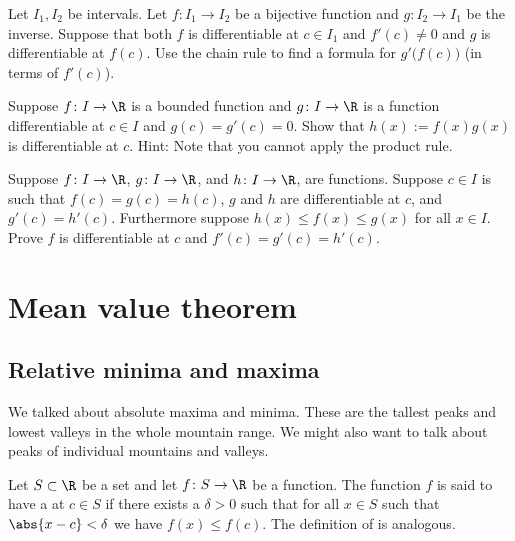 \documentclass[12pt]{book}
\begin{document}
\begin{exercise}
Let $I_1, I_2$ be intervals.
Let $f \colon I_1 \to I_2$ be a bijective function and $g \colon I_2 \to I_1$
be the inverse.
Suppose that both $f$ is differentiable at $c \in I_1$ and
$f'(c) \not=0$ and $g$ is differentiable at $f(c)$.
Use the chain rule
to find a formula for $g'\bigl(f(c)\bigr)$ (in terms of $f'(c)$).
\end{exercise}

\begin{exercise} \label{exercise:bndmuldiff}
Suppose $f \colon I \to \R$ is a bounded function and $g \colon I \to
\R$ is a function differentiable at $c \in I$ and $g(c) = g'(c) = 0$.
Show
that $h(x) := f(x) g(x)$ is differentiable at $c$.
Hint: Note that you
cannot apply the product rule.
\end{exercise}

\begin{exercise} \label{exercise:diffsqueeze}
Suppose $f \colon I \to \R$, 
$g \colon I \to \R$, and
$h \colon I \to \R$, are functions.
Suppose $c \in I$ is such that
$f(c) = g(c) = h(c)$, $g$ and $h$ are differentiable at $c$,
and $g'(c) = h'(c)$.
Furthermore suppose $h(x) \leq f(x) \leq g(x)$ for
all $x \in I$.
Prove $f$ is differentiable at $c$ and $f'(c) = g'(c) =
h'(c)$.
\end{exercise}




\sectionnewpage
\section{Mean value theorem}
\label{sec:mvt}


\subsection*{Relative minima and maxima}

We talked about absolute maxima and minima.
These are the tallest peaks and
lowest valleys in the whole mountain range.
We might also want to talk
about peaks of individual mountains and valleys.

\begin{defn}
Let $S \subset \R$ be a set and
let $f \colon S \to \R$ be a function.
The function $f$ is said to have
a \emph{} at $c \in S$ if there exists a $\delta>0$
such that for all $x \in S$ such that $\abs{x-c} < \delta$
we have $f(x) \leq f(c)$.
The definition of \emph{} is analogous.
\end{defn}
\end{document}
